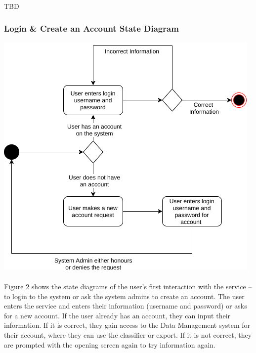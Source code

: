 \documentclass[12pt,oneside,letterpaper]{article}
\begin{document}
TBD

\subsubsection{Login \& Create an Account State Diagram}
\includegraphics[scale = 0.7]{Veazey_Login_State.png}
\begingroup
{}
\endgroup

\paragraph{} Figure 2 shows the state diagrams of the user's first interaction with the service -- to login to the system or ask the system admins to create an account. The user enters the service and enters their information (username and password) or asks for a new account. If the user already has an account, they can input their information. If it is correct, they gain access to the Data Management system for their account, where they can use the classifier or export. If it is not correct, they are prompted with the opening screen again to try information again.
\end{document}

